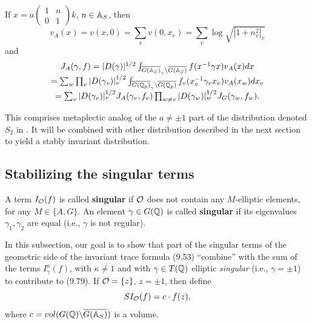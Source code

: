 If $x=a
\left(
\begin{array}{cc}
1&n\\
0&1
\end{array}
\right) k$, $n\in {\Bbb{A}}_S$, then
\begin{equation}
v_A(x)
=v(x,0)=\sum_v v(0,x_v)=
\sum_v \log\sqrt{|1+n_v^2|_v}
\end{equation}
and
\begin{equation}
\begin{array}{c}
J_A(\gamma,f)
=|D(\gamma)|^{1/2}
\int_{\overline{G({\Bbb{A}}_S)}_\gamma
\backslash \overline{G({\Bbb{A}}_S)}}
f(x^{-1}\gamma x)v_A(x)dx\\
=
\sum_w\prod_v
|D(\gamma_v)|_v^{1/2}
\int_{\overline{G({\Bbb{Q}}_p)}_\gamma
\backslash \overline{G({\Bbb{Q}}_p)}}
f_v(x_v^{-1}\gamma_v x_v)v_A(x_w)dx_v\\
=\sum_v |D(\gamma_v)|_v^{1/2} J_A(\gamma_v,f_v)
\prod_{w\not= v}|D(\gamma_w)|_w^{1/2} J_G(\gamma_w,f_w).
\end{array}
\end{equation}

\begin{remark} This comprises metaplectic analog of
the $a\not= \pm 1$
part of the distribution denoted $S_2$ in \cite{LL}. It
will be combined with other distribution
described in the next section to yield a stably
invariant distribution.
\end{remark}

\subsection{Stabilizing the singular terms}

A term $I_{\cal{O}}(f)$ is called {\bf singular} if ${\cal{O}}$
does not contain any $M$-elliptic elements, for any $M\in \{A,G\}$.
An element $\gamma\in G({\Bbb{Q}})$ is called {\bf singular}
if its eigenvalues $\gamma_1,\gamma_2$ are equal (i.e.,
$\gamma$ is not regular).

In this subsection, our goal is to show that part of
the singular terms of the geometric side of the invariant
trace formula (9.53) ``combine'' with the sum of the terms
$I_\gamma ^\kappa (f)$,
with $\kappa \neq 1$ and with
$\gamma \in T({\Bbb{Q}})$ elliptic \emph{singular}
(i.e., $\gamma =\pm 1$) to contribute to (9.79). 
If ${\cal O}=\{z\}$, $z=\pm 1$, then define
\begin{equation}
SI_{\cal O}(f)=c\cdot f(z),
\end{equation}
where $c=vol(G({\Bbb Q})\backslash \overline{G({\Bbb{A}}_S)})$ is a volume.

